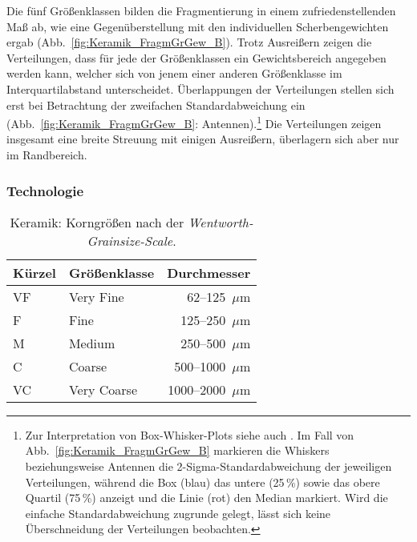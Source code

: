 Die fünf Größenklassen bilden die Fragmentierung in einem zufriedenstellenden Maß ab, wie eine Gegenüberstellung mit den individuellen Scherbengewichten ergab (Abb.~\ref{fig:Keramik_FragmGrGew_B}). Trotz Ausreißern zeigen die Verteilungen, dass für jede der Größenklassen ein Gewichtsbereich angegeben werden kann, welcher sich von jenem einer anderen Größenklasse im Interquartilabstand unterscheidet. Überlappungen der Verteilungen stellen sich erst bei Betrachtung der zweifachen Standardabweichung ein (Abb.~\ref{fig:Keramik_FragmGrGew_B}: Antennen).\footnote{Zur Interpretation von Box-Whisker-Plots siehe auch \textcite[81]{Hedderich.2016}. Im Fall von Abb.~\ref{fig:Keramik_FragmGrGew_B} markieren die Whiskers beziehungsweise Antennen die 2-Sigma-Standardabweichung der jeweiligen Verteilungen, während die Box (blau) das untere (25\,\%) sowie das obere Quartil (75\,\%) anzeigt und die Linie (rot) den Median markiert. Wird die einfache Standardabweichung zugrunde gelegt, lässt sich keine Überschneidung der Verteilungen beobachten.} Die Verteilungen zeigen insgesamt eine breite Streuung mit einigen Ausreißern, überlagern sich aber nur im Randbereich.

\subsubsection{Technologie}\label{sec:AufnahmeTechnologie}

\begin{table*}[!tb]
	\begin{center}
		{\small
			\begin{tabular}{@{}llr@{}}
				\toprule
				\textbf{Kürzel} & \textbf{Größenklasse} & \textbf{Durchmesser} \\
				\midrule
				VF & Very Fine & 62--125~$\mu$m \\
				F & Fine & 125--250~$\mu$m \\
				M & Medium & 250--500~$\mu$m \\
				C & Coarse & 500--1000~$\mu$m \\
				VC & Very Coarse & 1000--2000~$\mu$m \\
				\bottomrule
		\end{tabular}}
	\end{center}
	\caption{Keramik: Korngrößen nach der \textit{Wentworth-Grainsize-Scale}.}
	\label{tab:Keramik_PartikelGr}
\end{table*}

